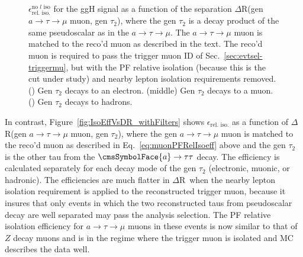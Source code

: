 \begin{figure}[hbtp]
\begin{center}
    \caption{$\epsilon_{\text{rel. iso.}}^{\text{no }l\text{ iso}}$ for the ggH signal as a function of the separation $\Delta$R(gen $a\rightarrow\tau\rightarrow\mu$ muon, gen $\tau_{\text{2}}$), where the gen $\tau_{\text{2}}$ is a decay product of the same pseudoscalar as in the $a\rightarrow\tau\rightarrow\mu$.  The $a\rightarrow\tau\rightarrow\mu$ muon is matched to the reco'd muon as described in the text.  The reco'd muon is required to pass the trigger muon ID of Sec.~\ref{sec:evtsel-triggermu}, but with the PF relative isolation (because this is the cut under study) and nearby lepton isolation requirements removed.  (\cmsLeft) Gen $\tau_{\text{2}}$ decays to an electron.  (middle) Gen $\tau_{\text{2}}$ decays to a muon.  (\cmsRight) Gen $\tau_{\text{2}}$ decays to hadrons.}
    \label{fig:IsoEffVsDR}
  \end{center}
\end{figure}

In contrast, Figure~\ref{fig:IsoEffVsDR_withFilters} shows $\epsilon_{\text{rel. iso.}}$ as a function of $\Delta$R(gen $a\rightarrow\tau\rightarrow\mu$ muon, gen $\tau_{\text{2}}$), where the gen $a\rightarrow\tau\rightarrow\mu$ muon is matched to the reco'd muon as described in Eq.~\ref{eq:muonPFRelIsoeff} above and the gen $\tau_{\text{2}}$ is the other tau from the $\cmsSymbolFace{a}\rightarrow\tau\tau$ decay.  The efficiency is calculated separately for each decay mode of the gen $\tau_{\text{2}}$ (electronic, muonic, or hadronic).  The efficiencies are much flatter in $\Delta$R\ when the nearby lepton isolation requirement is applied to the reconstructed trigger muon, because it insures that only events in which the two reconstructed taus from pseudoscalar decay are well separated may pass the analysis selection.  The PF relative isolation efficiency for $a\rightarrow\tau\rightarrow\mu$ muons in these events is now similar to that of $Z$ decay muons and is in the regime where the trigger muon is isolated and MC describes the data well.


